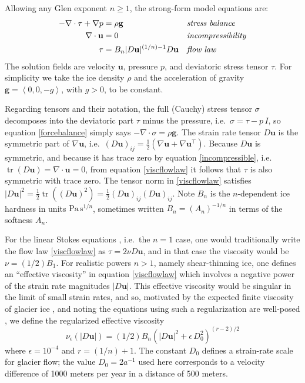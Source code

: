 \documentclass[letterpaper,final,12pt,reqno]{amsart}
\newcommand{\eps}{\epsilon}
\newcommand{\grad}{\nabla}
\newcommand{\Div}{\nabla\cdot}
\newcommand{\trace}{\operatorname{tr}}
\newcommand{\bg}{\mathbf{g}}
\newcommand{\bu}{\mathbf{u}}
\begin{document}
Allowing any Glen exponent $n\ge 1$, the strong-form model equations are:
\begin{align}
- \nabla \cdot \tau + \nabla p &= \rho \bg &&\text{\emph{stress balance}} \label{forcebalance} \\
\nabla \cdot \bu &= 0 &&\text{\emph{incompressibility}} \label{incompressible} \\
\tau &= B_n |D\bu|^{(1/n) - 1} D\bu  &&\text{\emph{flow law}} \label{viscflowlaw}
\end{align}
The solution fields are velocity $\bu$, pressure $p$, and deviatoric stress tensor $\tau$.  For simplicity we take the ice density $\rho$ and the acceleration of gravity $\bg=\left<0,0,-g\right>$, with $g>0$, to be constant.

Regarding tensors and their notation, the full (Cauchy) stress tensor $\sigma$ decomposes into the deviatoric part $\tau$ minus the pressure, i.e.~$\sigma = \tau - p\,I$, so equation \eqref{forcebalance} simply says $-\Div \sigma = \rho \bg$.  The strain rate tensor $D\bu$ is the symmetric part of $\grad \bu$, i.e.~$(D\bu)_{ij} = \frac{1}{2} \left(\grad\bu + \grad\bu^\top\right)$.  Because $D\bu$ is symmetric, and because it has trace zero by equation \eqref{incompressible}, i.e.~$\trace(D\bu)=\nabla \cdot \bu = 0$, from equation \eqref{viscflowlaw} it follows that $\tau$ is also symmetric with trace zero.  The tensor norm in \eqref{viscflowlaw} satisfies $|D\bu|^2 = \frac{1}{2} \trace\left((D\bu)^2\right) = \frac{1}{2} (D\bu)_{ij} (D\bu)_{ij}$.  Note $B_n$ is the $n$-dependent ice hardness in units $\text{Pa}\,\text{s}^{1/n}$, sometimes written $B_n = (A_n)^{-1/n}$ in terms of the softness $A_n$.

For the linear Stokes equations \cite{Elmanetal2014}, i.e.~the $n=1$ case, one would traditionally write the flow law \eqref{viscflowlaw} as $\tau = 2\nu D\bu$, and in that case the viscosity would be $\nu = (1/2) B_1$.  For realistic powers $n>1$, namely shear-thinning ice, one defines an ``effective viscosity'' in equation \eqref{viscflowlaw} which involves a negative power of the strain rate magnitudes $|D\bu|$.  This effective viscosity would be singular in the limit of small strain rates, and so, motivated by the expected finite viscosity of glacier ice \cite{GreveBlatter2009}, and noting the equations using such a regularization are well-posed \cite{JouvetRappaz2011}, we define the regularized effective viscosity
\begin{equation}
\nu_\eps(|D\bu|) = (1/2) B_n \left(|D\bu|^2 + \eps\, D_0^2\right)^{(r-2)/2} \label{regeffvisc}
\end{equation}
where $\eps = 10^{-4}$ and $r=(1/n)+1$.  The constant $D_0$ defines a strain-rate scale for glacier flow; the value $D_0 = 2 a^{-1}$ used here corresponds to a velocity difference of 1000 meters per year in a distance of 500 meters.
\end{document}
